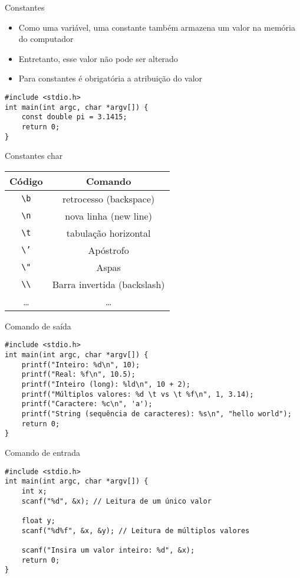 \documentclass[t, aspectratio=169]{beamer}
\begin{document}
\begin{frame}[label={sec:org999a32d},fragile]{Constantes}
 \begin{itemize}
\item Como uma variável, uma constante também armazena um valor na memória do computador
\item Entretanto, esse valor não pode ser alterado
\item Para constantes é obrigatória a atribuição do valor
\end{itemize}

\begin{verbatim}
#include <stdio.h>
int main(int argc, char *argv[]) {
    const double pi = 3.1415;
    return 0;
}
\end{verbatim}
\end{frame}

\begin{frame}[label={sec:orgb24d3ce},fragile]{Constantes char}
 \begin{center}
\begin{tabular}{*{2}{c}}
\toprule
\alert{Código} & \alert{Comando}\\
\midrule
\texttt{\textbackslash{}b} & retrocesso (backspace)\\
\texttt{\textbackslash{}n} & nova linha (new line)\\
\texttt{\textbackslash{}t} & tabulação horizontal\\
\texttt{\textbackslash{}'} & Apóstrofo\\
\texttt{\textbackslash{}"} & Aspas\\
\texttt{\textbackslash{}\textbackslash{}} & Barra invertida (backslash)\\
\ldots{} & \ldots{}\\
\bottomrule
\end{tabular}
\end{center}
\end{frame}

\begin{frame}[label={sec:org4267743},fragile]{Comando de saída}
 \begin{verbatim}
#include <stdio.h>
int main(int argc, char *argv[]) {
    printf("Inteiro: %d\n", 10);
    printf("Real: %f\n", 10.5);
    printf("Inteiro (long): %ld\n", 10 + 2);
    printf("Múltiplos valores: %d \t vs \t %f\n", 1, 3.14);
    printf("Caractere: %c\n", 'a');
    printf("String (sequência de caracteres): %s\n", "hello world");
    return 0;
}
\end{verbatim}
\end{frame}

\begin{frame}[label={sec:org1ebf3aa},fragile]{Comando de entrada}
 \begin{verbatim}
#include <stdio.h>
int main(int argc, char *argv[]) {
    int x;
    scanf("%d", &x); // Leitura de um único valor

    float y;
    scanf("%d%f", &x, &y); // Leitura de múltiplos valores

    scanf("Insira um valor inteiro: %d", &x);
    return 0;
}
\end{verbatim}
\end{frame}
\end{document}
